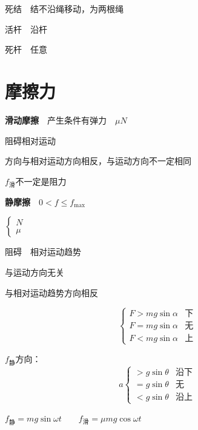 死结　结不沿绳移动，为两根绳

活杆　沿杆

死杆　任意



\section{摩擦力}
\textbf{滑动摩擦}　产生条件有弹力　$\mu N$

阻碍相对运动

方向与相对运动方向相反，与运动方向不一定相同

$f_{\text{滑}}$不一定是阻力



\textbf{静摩擦}　$0<f\le f_{\max}$ %

$\left\{\begin{array}{l}N\\ \mu\end{array}\right.$

阻碍　相对运动趋势

与运动方向无关

与相对运动趋势方向相反


\[
\left\{\begin{array}{ll}
F>mg\sin\alpha & \text{下}\\
F=mg\sin\alpha & \text{无}\\
F<mg\sin\alpha & \text{上}
\end{array}\right.
\]

$f_{\text{静}}$方向：
\[
a\left\{\begin{array}{ll}
>g\sin\theta & \text{沿下}\\
=g\sin\theta & \text{无}\\
<g\sin\theta & \text{沿上}
\end{array}\right.
\]


$f_{\text{静}}=mg\sin\omega t$　　$f_{\text{滑}}=\mu mg\cos\omega t$



